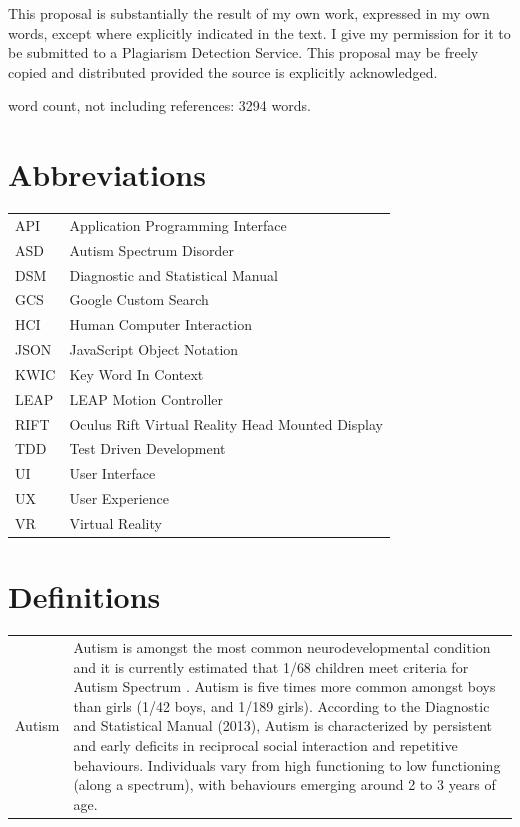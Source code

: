 \documentclass[a4paper, 10pt]{article}
\begin{document}
This proposal is substantially the result of my own work, expressed in my own words, except where explicitly indicated in the text. I give my permission for it to be submitted to a Plagiarism Detection Service. This proposal may be freely copied and distributed provided the source is explicitly acknowledged.

\begin{center}
word count, not including references: 3294 words.
\end{center}

\clearpage
\tableofcontents

\section*{Abbreviations}
\begin{tabular}{l l }
API & Application Programming Interface\\
ASD & Autism Spectrum Disorder\\
DSM & Diagnostic and Statistical Manual\\
GCS & Google Custom Search\\
HCI & Human Computer Interaction\\
JSON & JavaScript Object Notation\\
KWIC & Key Word In Context\\
LEAP & LEAP Motion Controller\\
RIFT & Oculus Rift Virtual Reality Head Mounted Display\\
TDD & Test Driven Development\\
UI & User Interface\\
UX & User Experience\\
VR & Virtual Reality\\
\end{tabular}

\section*{Definitions}
\begin{tabular}{l p{15cm}  }
Autism & Autism is amongst the most common neurodevelopmental condition and it is currently estimated that 1/68 children meet criteria for Autism Spectrum \cite{CDC}. Autism is five times more common amongst boys than girls (1/42 boys, and 1/189 girls). According to the Diagnostic and Statistical Manual (2013), Autism is characterized by persistent and early deficits in reciprocal social interaction and repetitive behaviours. Individuals vary from high functioning to low functioning (along a spectrum), with behaviours emerging around 2 to 3 years of age.
\end{tabular}
\clearpage
\end{document}
